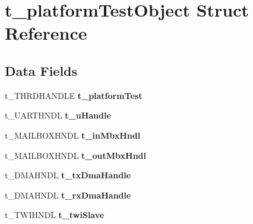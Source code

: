 \hypertarget{structt__platform_test_object}{\section{t\-\_\-platform\-Test\-Object Struct Reference}
\label{structt__platform_test_object}
}
\subsection*{Data Fields}
\begin{DoxyCompactItemize}
\item 
\hypertarget{structt__platform_test_object_a321ea5d962001d63ccd1eb162fe13741}{t\-\_\-\-T\-H\-R\-D\-H\-A\-N\-D\-L\-E {\bfseries t\-\_\-platform\-Test}}\label{structt__platform_test_object_a321ea5d962001d63ccd1eb162fe13741}

\item 
\hypertarget{structt__platform_test_object_adff9fcc9b301fd4d7521fb37d7490034}{t\-\_\-\-U\-A\-R\-T\-H\-N\-D\-L {\bfseries t\-\_\-u\-Handle}}\label{structt__platform_test_object_adff9fcc9b301fd4d7521fb37d7490034}

\item 
\hypertarget{structt__platform_test_object_a1a1d89e344582d4591af0a7a4195e965}{t\-\_\-\-M\-A\-I\-L\-B\-O\-X\-H\-N\-D\-L {\bfseries t\-\_\-in\-Mbx\-Hndl}}\label{structt__platform_test_object_a1a1d89e344582d4591af0a7a4195e965}

\item 
\hypertarget{structt__platform_test_object_ab282dafde7e0c9de186d94231979f673}{t\-\_\-\-M\-A\-I\-L\-B\-O\-X\-H\-N\-D\-L {\bfseries t\-\_\-out\-Mbx\-Hndl}}\label{structt__platform_test_object_ab282dafde7e0c9de186d94231979f673}

\item 
\hypertarget{structt__platform_test_object_a80ed2075c92da3702598f3305e71bfd2}{t\-\_\-\-D\-M\-A\-H\-N\-D\-L {\bfseries t\-\_\-tx\-Dma\-Handle}}\label{structt__platform_test_object_a80ed2075c92da3702598f3305e71bfd2}

\item 
\hypertarget{structt__platform_test_object_aed6f4ad92a31aff81800f7f372e5779a}{t\-\_\-\-D\-M\-A\-H\-N\-D\-L {\bfseries t\-\_\-rx\-Dma\-Handle}}\label{structt__platform_test_object_aed6f4ad92a31aff81800f7f372e5779a}

\item 
\hypertarget{structt__platform_test_object_a73e8e28873505ba56d9b72584e9c600e}{t\-\_\-\-T\-W\-I\-H\-N\-D\-L {\bfseries t\-\_\-twi\-Slave}}\label{structt__platform_test_object_a73e8e28873505ba56d9b72584e9c600e}


\end{DoxyCompactItemize}
